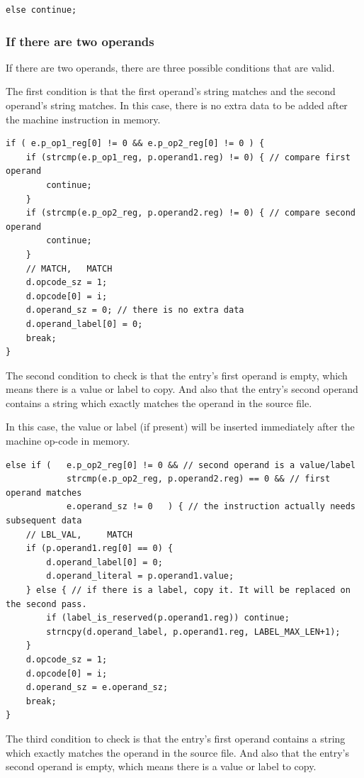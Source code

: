 \documentclass[a4paper]{report}
\begin{document}
\begin{lstlisting}
else continue;
\end{lstlisting}

\subsubsection{If there are two operands}

If there are two operands, there are three possible conditions that are valid.

The first condition is that the first operand's string matches and the second
operand's string matches. In this case, there is no extra data to be added after
the machine instruction in memory.

\begin{lstlisting}
if ( e.p_op1_reg[0] != 0 && e.p_op2_reg[0] != 0 ) {
	if (strcmp(e.p_op1_reg, p.operand1.reg) != 0) { // compare first operand
		continue;
	}
	if (strcmp(e.p_op2_reg, p.operand2.reg) != 0) { // compare second operand
		continue;
	}
	// MATCH,	MATCH
	d.opcode_sz = 1;
	d.opcode[0] = i;
	d.operand_sz = 0; // there is no extra data
	d.operand_label[0] = 0;
	break;
}
\end{lstlisting}

The second condition to check is that the entry's first operand is empty, which
means there is a value or label to copy. And also that the entry's second
operand contains a string which exactly matches the operand in the source file.

In this case, the value or label (if present) will be inserted immediately after
the machine op-code in memory.

\begin{lstlisting}
else if (	e.p_op2_reg[0] != 0 && // second operand is a value/label
			strcmp(e.p_op2_reg, p.operand2.reg) == 0 && // first operand matches
			e.operand_sz != 0	) { // the instruction actually needs subsequent data
	// LBL_VAL,		MATCH
	if (p.operand1.reg[0] == 0) {
		d.operand_label[0] = 0;
		d.operand_literal = p.operand1.value;
	} else { // if there is a label, copy it. It will be replaced on the second pass.
		if (label_is_reserved(p.operand1.reg)) continue;
		strncpy(d.operand_label, p.operand1.reg, LABEL_MAX_LEN+1);
	}
	d.opcode_sz = 1;
	d.opcode[0] = i;
	d.operand_sz = e.operand_sz;
	break;
}
\end{lstlisting}

The third condition to check is that the entry's first operand contains a string
which exactly matches the operand in the source file. And also that the entry's
second operand is empty, which means there is a value or label to copy.
\end{document}
